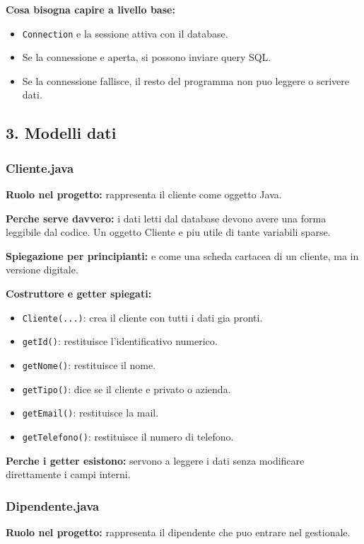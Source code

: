 \documentclass[12pt,a4paper]{article}
\begin{document}
\textbf{Cosa bisogna capire a livello base:}
\begin{itemize}
  \item \texttt{Connection} e la sessione attiva con il database.
  \item Se la connessione e aperta, si possono inviare query SQL.
  \item Se la connessione fallisce, il resto del programma non puo leggere o scrivere dati.
\end{itemize}

\subsection{3. Modelli dati}

\subsubsection*{Cliente.java}
\textbf{Ruolo nel progetto:} rappresenta il cliente come oggetto Java.

\textbf{Perche serve davvero:} i dati letti dal database devono avere una forma leggibile dal codice. Un oggetto Cliente e piu utile di tante variabili sparse.

\textbf{Spiegazione per principianti:} e come una scheda cartacea di un cliente, ma in versione digitale.

\textbf{Costruttore e getter spiegati:}
\begin{itemize}
  \item \texttt{Cliente(...)}: crea il cliente con tutti i dati gia pronti.
  \item \texttt{getId()}: restituisce l'identificativo numerico.
  \item \texttt{getNome()}: restituisce il nome.
  \item \texttt{getTipo()}: dice se il cliente e privato o azienda.
  \item \texttt{getEmail()}: restituisce la mail.
  \item \texttt{getTelefono()}: restituisce il numero di telefono.
\end{itemize}

\textbf{Perche i getter esistono:} servono a leggere i dati senza modificare direttamente i campi interni.

\subsubsection*{Dipendente.java}
\textbf{Ruolo nel progetto:} rappresenta il dipendente che puo entrare nel gestionale.
\end{document}
